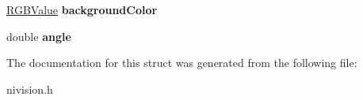 \begin{DoxyCompactItemize}
\item 
\hypertarget{structOverlayTextOptions__struct_a0b34d0d5d547d7404b724128d5744e48}{
\hyperlink{structRGBValue__struct}{RGBValue} {\bfseries backgroundColor}}
\label{structOverlayTextOptions__struct_a0b34d0d5d547d7404b724128d5744e48}

\item 
\hypertarget{structOverlayTextOptions__struct_a16867b5bef31e3323f890997917ec193}{
double {\bfseries angle}}
\label{structOverlayTextOptions__struct_a16867b5bef31e3323f890997917ec193}

\end{DoxyCompactItemize}


The documentation for this struct was generated from the following file:\begin{DoxyCompactItemize}
\item 
nivision.h\end{DoxyCompactItemize}
